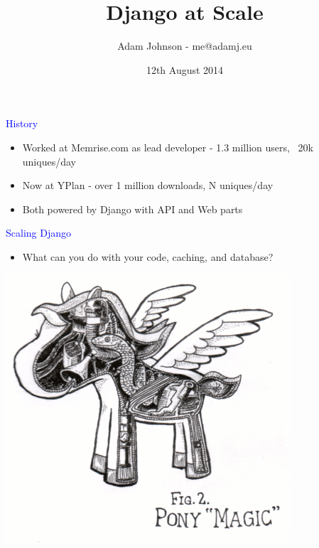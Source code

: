 \documentclass[landscape]{slides}
\title{Django at Scale}
\author{Adam Johnson - me@adamj.eu}
\date{12th August 2014}
\begin{document}
\maketitle


\begin{slide}

    \textcolor{blue}{\Large{History}}

    \begin{itemize}
        \item Worked at Memrise.com as lead developer - 1.3 million users, ~20k uniques/day
        \item Now at YPlan - over 1 million downloads, N uniques/day
        \item Both powered by Django with API and Web parts
    \end{itemize}

\end{slide}


\begin{slide}

    \textcolor{blue}{\Large{Scaling Django}}

    \begin{itemize}
        \item What can you do with your code, caching, and database?
    \end{itemize}

    \begin{center}
        \includegraphics[height=10cm]{pony-magic}
    \end{center}

\end{slide}
\end{document}
